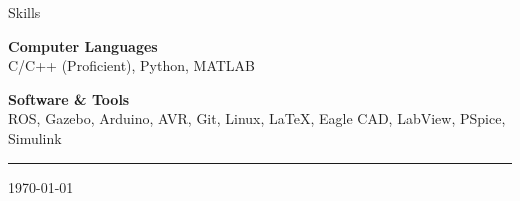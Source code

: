 \documentclass{resume} %
\begin{document}
\begin{rSection}{Skills}


\textbf{Computer Languages }\\
C/C++ (Proficient), Python, MATLAB 

\vspace{0.5 em}

\textbf{Software \& Tools}\\
ROS, Gazebo, Arduino, AVR, Git, Linux, \LaTeX, Eagle CAD, LabView, PSpice, Simulink \\


\end{rSection}
%

\vspace{0.5 em}
\hrule
\monthyeardate\today
\end{document}
